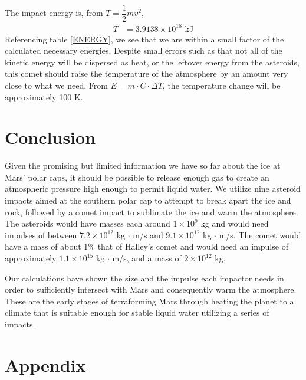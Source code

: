 \documentclass[a4paper]{article}
\begin{document}
	The impact energy is, from $T = \dfrac{1}{2} m v^2$,
	\begin{align*}
	T &= 3.9138 \times 10^{18} \text{ kJ}
	\end{align*}
    Referencing table \ref{ENERGY}, we see that we are within a small factor of the calculated necessary energies. Despite small errors such as that not all of the kinetic energy will be dispersed as heat, or the leftover energy from the asteroids, this comet should raise the temperature of the atmosphere by an amount very close to what we need. From $E = m \cdot C \cdot \Delta T$, the temperature change will be approximately 100 K.
    
    
    \section{Conclusion}
    Given the promising but limited information we have so far about the ice at Mars' polar caps, it should be possible to release enough gas to create an atmospheric pressure high enough to permit liquid water. We utilize nine asteroid impacts aimed at the southern polar cap to attempt to break apart the ice and rock, followed by a comet impact to sublimate the ice and warm the atmosphere. The asteroids would have masses each around $1 \times 10^9$ kg and would need impulses of between $7.2 \times 10^{12}$ kg $\cdot$ m/s and $9.1 \times 10^{12}$ kg $\cdot$ m/s. The comet would have a mass of about 1\% that of Halley's comet and would need an impulse of approximately $1.1 \times 10^{15}$ kg $\cdot$ m/s, and a mass of $2 \times 10^{12}$ kg.
    
Our calculations have shown the size and the impulse each impactor needs in order to sufficiently intersect with Mars and consequently warm the atmosphere. These are the early stages of terraforming Mars through heating the planet to a climate that is suitable enough for stable liquid water utilizing a series of impacts. 
    \clearpage
	\appendix
	\section{Appendix}	
\end{document}
